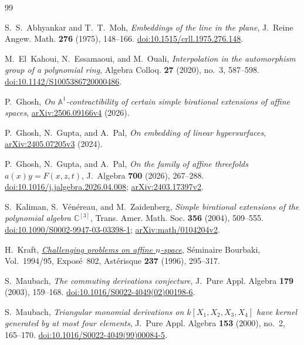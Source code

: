 \documentclass[11pt]{article}
\numberwithin{equation}{section}
\newcommand{\CC}{\mathbb C}
\newcommand{\Aff}{\mathbb A}
\begin{document}
\begin{thebibliography}{99}
\small

S.~S.~Abhyankar and T.~T.~Moh,
\emph{Embeddings of the line in the plane},
J.~Reine Angew. Math. \textbf{276} (1975), 148--166.
\href{https://doi.org/10.1515/crll.1975.276.148}{doi:10.1515/crll.1975.276.148}.

M.~El~Kahoui, N.~Essamaoui, and M.~Ouali,
\emph{Interpolation in the automorphism group of a polynomial ring},
Algebra Colloq. \textbf{27} (2020), no.~3, 587--598.
\href{https://doi.org/10.1142/S1005386720000486}{doi:10.1142/S1005386720000486}.

P.~Ghosh,
\emph{On $\Aff^1$-contractibility of certain simple birational extensions of affine spaces},
\href{https://arxiv.org/abs/2506.09166v4}{arXiv:2506.09166v4} (2026).

P.~Ghosh, N.~Gupta, and A.~Pal,
\emph{On embedding of linear hypersurfaces},
\href{https://arxiv.org/abs/2405.07205v3}{arXiv:2405.07205v3} (2024).

P.~Ghosh, N.~Gupta, and A.~Pal,
\emph{On the family of affine threefolds $a(x)y=F(x,z,t)$},
J.~Algebra \textbf{700} (2026), 267--288.
\href{https://doi.org/10.1016/j.jalgebra.2026.04.008}{doi:10.1016/j.jalgebra.2026.04.008};
\href{https://arxiv.org/abs/2403.17397v2}{arXiv:2403.17397v2}.

S.~Kaliman, S.~V\'en\'ereau, and M.~Zaidenberg,
\emph{Simple birational extensions of the polynomial algebra $\CC^{[3]}$},
Trans. Amer. Math. Soc. \textbf{356} (2004), 509--555.
\href{https://doi.org/10.1090/S0002-9947-03-03398-1}{doi:10.1090/S0002-9947-03-03398-1};
\href{https://arxiv.org/abs/math/0104204v2}{arXiv:math/0104204v2}.

H.~Kraft,
\emph{\href{https://numdam.org/item/SB_1994-1995__37__295_0/}{Challenging problems on affine $n$-space}},
S\'eminaire Bourbaki, Vol.~1994/95, Expos\'e~802,
Ast\'erisque \textbf{237} (1996), 295--317.

S.~Maubach,
\emph{The commuting derivations conjecture},
J.~Pure Appl. Algebra \textbf{179} (2003), 159--168.
\href{https://doi.org/10.1016/S0022-4049(02)00198-6}{doi:10.1016/S0022-4049(02)00198-6}.

S.~Maubach,
\emph{Triangular monomial derivations on $k[X_1,X_2,X_3,X_4]$ have kernel
generated by at most four elements},
J.~Pure Appl. Algebra \textbf{153} (2000), no.~2, 165--170.
\href{https://doi.org/10.1016/S0022-4049(99)00084-5}{doi:10.1016/S0022-4049(99)00084-5}.


\end{thebibliography}
\end{document}
